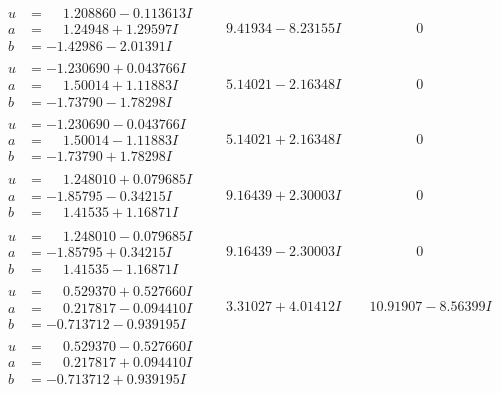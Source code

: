 \documentclass[1p]{elsarticle_modified}
\theoremstyle{definition}
\begin{document}
$$\begin{array}{c|c|c}
\begin{aligned}
u &= \phantom{-}1.208860 - 0.113613 I \\
a &= \phantom{-}1.24948 + 1.29597 I \\
b &= -1.42986 - 2.01391 I\end{aligned}
 & \phantom{-}9.41934 - 8.23155 I & \phantom{-0.000000 } 0 \\ \hline\begin{aligned}
u &= -1.230690 + 0.043766 I \\
a &= \phantom{-}1.50014 + 1.11883 I \\
b &= -1.73790 - 1.78298 I\end{aligned}
 & \phantom{-}5.14021 - 2.16348 I & \phantom{-0.000000 } 0 \\ \hline\begin{aligned}
u &= -1.230690 - 0.043766 I \\
a &= \phantom{-}1.50014 - 1.11883 I \\
b &= -1.73790 + 1.78298 I\end{aligned}
 & \phantom{-}5.14021 + 2.16348 I & \phantom{-0.000000 } 0 \\ \hline\begin{aligned}
u &= \phantom{-}1.248010 + 0.079685 I \\
a &= -1.85795 - 0.34215 I \\
b &= \phantom{-}1.41535 + 1.16871 I\end{aligned}
 & \phantom{-}9.16439 + 2.30003 I & \phantom{-0.000000 } 0 \\ \hline\begin{aligned}
u &= \phantom{-}1.248010 - 0.079685 I \\
a &= -1.85795 + 0.34215 I \\
b &= \phantom{-}1.41535 - 1.16871 I\end{aligned}
 & \phantom{-}9.16439 - 2.30003 I & \phantom{-0.000000 } 0 \\ \hline\begin{aligned}
u &= \phantom{-}0.529370 + 0.527660 I \\
a &= \phantom{-}0.217817 - 0.094410 I \\
b &= -0.713712 - 0.939195 I\end{aligned}
 & \phantom{-}3.31027 + 4.01412 I & \phantom{-}10.91907 - 8.56399 I \\ \hline\begin{aligned}
u &= \phantom{-}0.529370 - 0.527660 I \\
a &= \phantom{-}0.217817 + 0.094410 I \\
b &= -0.713712 + 0.939195 I\end{aligned}

\end{array}$$
\end{document}
